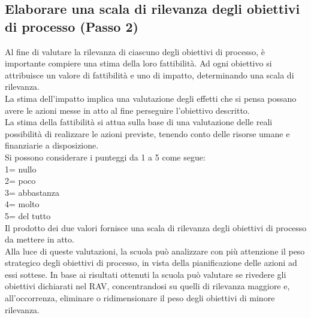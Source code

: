\documentclass[12pt,a4paper,oneside]{memoir}
\begin{document}
\clearpage

\subsection[Passo 2. Elaborare una scala di rilevanza degli obiettivi di processo]{Elaborare una scala di rilevanza degli obiettivi di processo (Passo 2)}
Al fine di valutare la rilevanza di ciascuno degli obiettivi di processo, è importante compiere una stima della loro fattibilità. Ad ogni obiettivo si attribuisce un valore di fattibilità e uno di impatto, determinando una scala di rilevanza.\\

La stima dell'impatto implica una valutazione degli effetti che si pensa possano avere le azioni messe in atto al fine perseguire l'obiettivo descritto.\\

La stima della fattibilità si attua sulla base di una valutazione delle reali possibilità di realizzare le azioni previste, tenendo conto delle risorse umane e finanziarie a disposizione.\\

Si possono considerare i punteggi da 1 a 5 come segue:\\
1= nullo\\
2= poco\\
3= abbastanza\\
4= molto\\
5= del tutto\\

Il prodotto dei due valori fornisce una scala di rilevanza degli obiettivi di processo da mettere in atto.\\

Alla luce di queste valutazioni, la scuola può analizzare con più attenzione il peso strategico degli obiettivi di processo, in vista della pianificazione delle azioni ad essi sottese. In base ai risultati ottenuti la scuola può valutare se rivedere gli obiettivi dichiarati nel RAV, concentrandosi su quelli di rilevanza maggiore e, all'occorrenza, eliminare o ridimensionare il peso degli obiettivi di minore rilevanza.\\


\begin{center}
\end{center}
\end{document}
